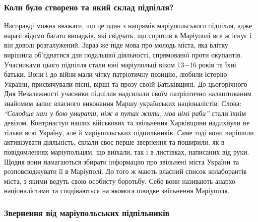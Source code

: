 \subsubsection{Коли було створено та який склад підпілля?}


Насправді можна вважати, що це один з напрямів маріупольського підпілля, адже
наразі відомо багато випадків, які свідчать, що спротив в Маріуполі все ж існує
і він доволі розгалужений. Зараз же піде мова про молодь міста, яка влітку
вирішила об'єднатися для подальшої діяльності, спрямованої проти окупантів.
Учасниками цього підпілля стали юні маріупольці віком 13−16 років та їхні
батьки. Вони і до війни мали чітку патріотичну позицію, любили історію України,
присвячували пісні, вірші та прозу своїй Батьківщині. До цьогорічного Дня
Незалежності учасники підпілля надсилали своїм патріотично налаштованим
знайомим запис власного виконання Маршу українських націоналістів. Слова:
\emph{\enquote{Солодше нам у бою умирати, ніж в путах жити, мов німі раби}} стали їхнім
девізом. Контрнаступ наших військових та звільнення Харківщини надихнули не
тільки всю Україну, але й маріупольських підпильників. Саме тоді вони вирішили
активізувати діяльність, склали своє перше звернення та поширили, як в
повідомленнях маріупольцям, що виїхали, так і в листівках, написаних від руки.
Щодня вони намагаються збирати інформацію про звільнені міста України та
розповсюджувати її в Маріуполі. До того ж мають власний список колаборантів
міста, з якими ведуть свою особисту боротьбу. Себе вони називають
анархо-націоналістами та сподіваються на якомога швидке звільнення Маріуполя.

\subsubsection{Звернення від маріупольських підпільників}


